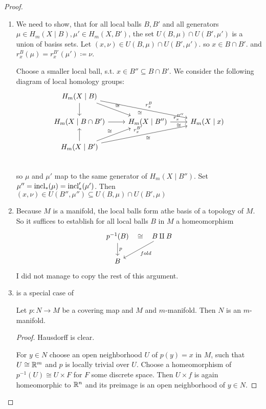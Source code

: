 \documentclass[language=english]{TemplateLecture}
\begin{document}
\begin{proof}
    \begin{enumerate}
        \item We need to show, that for all local balls \(B, B'\) and all generators \(\mu \in H_m(X \mid B), \mu' \in H_m(X,B')\), the set \(U(B, \mu) \cap U(B', \mu')\) is a union of basiss sets. Let \((x, \nu) \in U(B, \mu) \cap U(B', \mu')\). so \(x \in B \cap B'\). and \(r_x^B(\mu) = r_x^{B'}(\mu') \coloneq \nu\).

        Choose a smaller local ball, s.t. \(x \in B'' \subseteq B \cap B'\). We consider the following diagram of local homology groups:
        \[\begin{tikzcd}
            H_m(X \mid B) \ar[rrd, "r_x^B", "\cong"']\ar[d] \ar[dr, "\cong"] & & \\
            H_m(X\mid B \cap B') \ar[r] & H_m(X \mid B'') \ar[r, "r_x^{B''}", "\cong"'] & H_m(X \mid x) \\
            H_m(X \mid B') \ar[rru, "r_x^{B'}", "\cong"'] \ar[u] \ar[ur, "\cong"]\\
        \end{tikzcd}\]
        so \(\mu\) and \(\mu'\) map to the same generator of \(H_m(X \mid B'')\). Set \(\mu'' = \operatorname{incl}_*(\mu) = \operatorname{incl}'_*(\mu')\). Then \((x, \nu) \in U(B'', \mu'') \subseteq U(B, \mu) \cap U(B', \mu)\)

        \item Because \(M\) is a manifold, the local balls form athe basis of a topology of \(M\). So it suffices to establish for all local balls \(B\) in \(M\) a homeomorphism
        \[\begin{tikzcd}
            p^{-1}(B)\ar[d, "p"] \ar[r, phantom, "\cong"] & B\amalg B  \ar[dl, "fold"]\\
            B
        \end{tikzcd}\]
        I did not manage to copy the rest of this argument.

        \item is a special case of 
        \begin{proposition}
            Let \(p \colon N \to M\) be a covering map and \(M\) and \(m\)-manifold. Then \(N\) is an \(m\)-manifold.
        \end{proposition}
        \begin{proof}
            Hausdorff is clear. 

            For \(y \in N\) choose an open neighborhood \(U\) of \(p(y) = x\) in \(M\), such that \(U \cong \mathbb{R}^m\) and \(p\) is locally trivial over \(U\). Choose a homeomorphism of \(p^{-1}(U) \cong U\times F\) for \(F\) some discrete space. Then \(U\times {f}\) is again homeomorphic to \(\mathbb{R}^n\) and its preimage is an open neighborhood of \(y \in N\).
        \end{proof}
\end{enumerate}
\end{proof}
\end{document}
